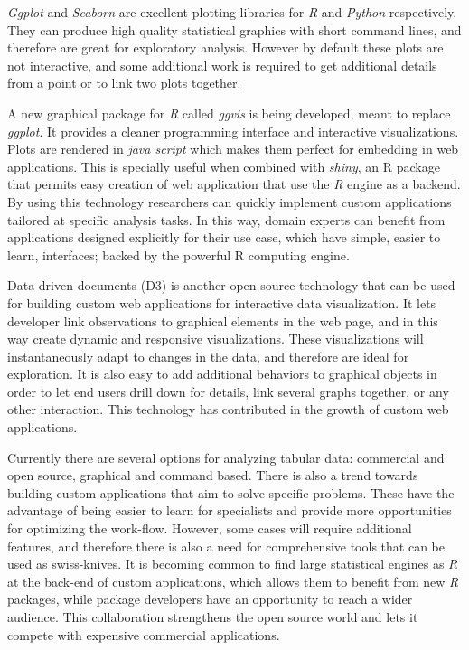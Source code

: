 
\emph{Ggplot} \autocite{wickham_practical_2008} and \emph{Seaborn}
 \autocite{michael_waskom_seaborn:_2015} are excellent plotting libraries for \emph{R} and \emph{Python} respectively. They can produce high quality statistical graphics with short command lines, and therefore are great for exploratory analysis. However by default these plots are not interactive, and some additional work is required to get additional details from a point or to link two plots together. 

A new graphical package for \emph{R} called \emph{ggvis} is being developed, meant to replace \emph{ggplot}. It provides a cleaner programming interface and interactive visualizations. Plots are rendered in \emph{java script} which makes them perfect for embedding in web applications. This is specially useful when combined with \emph{shiny}, an R package that permits easy creation of web application that use the \emph{R} engine as a backend. By using this technology researchers can quickly implement custom applications tailored at specific analysis tasks. In this way, domain experts can benefit from applications designed explicitly for their use case, which have simple, easier to learn, interfaces; backed by the powerful R computing engine.

Data driven documents (D3) \autocite{bostock_d3_2011} is another open source technology that can be used for building custom web applications for interactive data visualization. It lets developer link observations to graphical elements in the web page, and in this way create dynamic and responsive visualizations. These visualizations will instantaneously adapt to changes in the data, and therefore are ideal for exploration. It is also easy to add additional behaviors to graphical objects in order to let end users drill down for details, link several graphs together, or any other interaction. This technology has contributed in the growth of custom web applications.

\medskip

Currently there are several options for analyzing tabular data: commercial and open source, graphical and command based. There is also a trend towards building custom applications that aim to solve specific problems. These have the advantage of being easier to learn for specialists and provide more opportunities for optimizing the work-flow. However, some cases will require additional features, and therefore there is also a need for comprehensive tools that can be used as swiss-knives. It is becoming common to find large statistical engines as \emph{R} at the back-end of custom applications, which allows them to benefit from new \emph{R} packages, while  package developers have an opportunity to reach a wider audience. This collaboration strengthens the open source world and lets it compete with expensive commercial applications.

